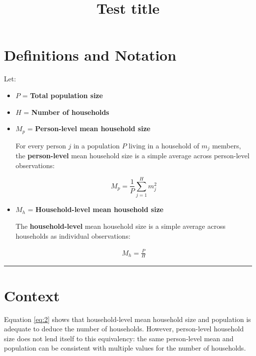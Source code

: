 \documentclass[
]{article}
\title{Test title}
\author{}
\date{\vspace{-2.5em}}
\begin{document}
\maketitle

\hypertarget{definitions-and-notation}{%
\section{Definitions and Notation}\label{definitions-and-notation}}

Let:

\begin{itemize}
\item
  \(P\) = \textbf{Total population size}
\item
  \(H\) = \textbf{Number of households}
\item
  \(M_p\) = \textbf{Person-level mean household size}

  For every person \(j\) in a population \(P\) living in a household of
  \(m_j\) members, the \textbf{person-level} mean household size is a
  simple average across person-level observations:

  \begin{equation}
    \label{eq:1}
    \tag{1}
    M_p = \frac{1}{P} \sum_{j = 1}^H m_j^2
    \end{equation}
\item
  \(M_h\) = \textbf{Household-level mean household size}

  The \textbf{household-level} mean household size is a simple average
  across households as individual observations:

  \begin{align}
    \label{eq:2}
    \tag{2}
    M_h = \frac{P}{H}
    \end{align}
\end{itemize}

\begin{center}\rule{0.5\linewidth}{0.5pt}\end{center}

\hypertarget{context}{%
\section{Context}\label{context}}

Equation \eqref{eq:2} shows that household-level mean household size and
population is adequate to deduce the number of households. However,
person-level household size does not lend itself to this equivalency:
the same person-level mean and population can be consistent with
multiple values for the number of households.
\end{document}
